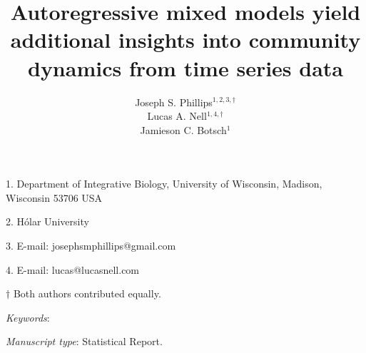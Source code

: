 \documentclass[12pt]{article}
\title{Autoregressive mixed models yield additional insights into community dynamics
from time series data}
\author{
Joseph S. Phillips$^{1,2,3,\dagger}$ \\
Lucas A. Nell$^{1,4,\dagger}$ \\
Jamieson C. Botsch$^{1}$}
\date{}
\begin{document}
\maketitle


\noindent{} 1. Department of Integrative Biology, University of Wisconsin, Madison, Wisconsin 53706 USA

\noindent{} 2. Hólar University

\noindent{} 3. E-mail: josephsmphillips@gmail.com

\noindent{} 4. E-mail: lucas@lucasnell.com

\noindent{} $\dagger$ Both authors contributed equally.



\bigskip


\bigskip


\textit{Keywords}: {
}


\bigskip

\textit{Manuscript type}: Statistical Report.


\linenumbers{}

\newpage{}





\newpage{}





\end{document}
